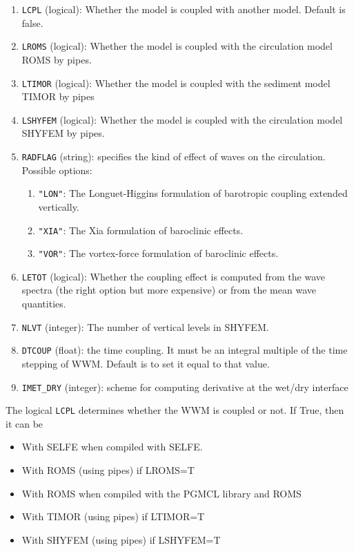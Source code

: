 \documentclass[12pt]{amsart}
\begin{document}
\begin{enumerate}
\item {\tt LCPL} (logical): Whether the model is coupled with another model. Default is false.
\item {\tt LROMS} (logical): Whether the model is coupled with the circulation model ROMS by pipes.
\item {\tt LTIMOR} (logical): Whether the model is coupled with the sediment model TIMOR by pipes
\item {\tt LSHYFEM} (logical): Whether the model is coupled with the circulation model SHYFEM by pipes.
\item {\tt RADFLAG} (string): specifies the kind of effect of waves on the circulation. Possible options:
  \begin{enumerate}
  \item {\tt "LON"}: The Longuet-Higgins formulation of barotropic coupling extended vertically.
  \item {\tt "XIA"}: The Xia formulation of baroclinic effects.
  \item {\tt "VOR"}: The vortex-force formulation of baroclinic effects.
  \end{enumerate}
\item {\tt LETOT} (logical): Whether the coupling effect is computed from the wave spectra (the right option but more expensive) or from the mean wave quantities.
\item {\tt NLVT} (integer): The number of vertical levels in SHYFEM.
\item {\tt DTCOUP} (float): the time coupling. It must be an integral multiple of the time stepping of WWM. Default is to set it equal to that value.
\item {\tt IMET\_DRY} (integer): scheme for computing derivative at the wet/dry interface
\end{enumerate}

The logical {\tt LCPL} determines whether the WWM is coupled or not.
If True, then it can be
\begin{itemize}
\item With SELFE when compiled with SELFE.
\item With ROMS (using pipes) if LROMS=T
\item With ROMS when compiled with the PGMCL library and ROMS
\item With TIMOR (using pipes) if LTIMOR=T
\item With SHYFEM (using pipes) if LSHYFEM=T
\end{itemize}
\end{document}
